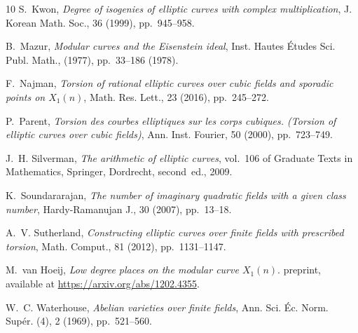\documentclass[11pt,reqno]{amsart}
\theoremstyle{definition}
\numberwithin{equation}{section}
\begin{document}
\begin{thebibliography}{10}
{\sc S.~Kwon}, {\em Degree of isogenies of elliptic curves with complex multiplication}, J. Korean Math. Soc., 36 (1999), pp.~945--958.

{\sc B.~Mazur}, {\em Modular curves and the {E}isenstein ideal}, Inst. Hautes \'Etudes Sci. Publ. Math.,  (1977), pp.~33--186 (1978).

{\sc F.~Najman}, {\em Torsion of rational elliptic curves over cubic fields and sporadic points on {$X_1(n)$}}, Math. Res. Lett., 23 (2016), pp.~245--272.

{\sc P.~Parent}, {\em Torsion des courbes elliptiques sur les corps cubiques. ({Torsion} of elliptic curves over cubic fields)}, Ann. Inst. Fourier, 50 (2000), pp.~723--749.

{\sc J.~H. Silverman}, {\em The arithmetic of elliptic curves}, vol.~106 of Graduate Texts in Mathematics, Springer, Dordrecht, second~ed., 2009.

{\sc K.~Soundararajan}, {\em The number of imaginary quadratic fields with a given class number}, Hardy-Ramanujan J., 30 (2007), pp.~13--18.

{\sc A.~V. Sutherland}, {\em Constructing elliptic curves over finite fields with prescribed torsion}, Math. Comput., 81 (2012), pp.~1131--1147.

{\sc M.~van Hoeij}, {\em Low degree places on the modular curve ${X}_1(n)$}.
\newblock preprint, available at \url{https://arxiv.org/abs/1202.4355}.

{\sc W.~C. Waterhouse}, {\em Abelian varieties over finite fields}, Ann. Sci. {\'E}c. Norm. Sup{\'e}r. (4), 2 (1969), pp.~521--560.

\end{thebibliography}
\end{document}
